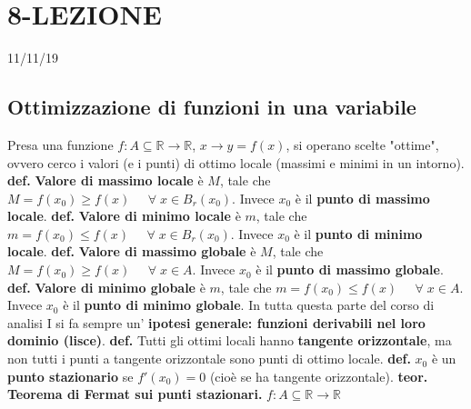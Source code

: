 \section*{8-LEZIONE}
11/11/19
\subsection*{Ottimizzazione di funzioni in una variabile}
Presa una funzione $f: A \subseteq \mathbb{R} \rightarrow  \mathbb{R}$, $x \rightarrow  y = f(x)$, si operano scelte "ottime", ovvero cerco i valori (e i punti) di ottimo locale (massimi e minimi in un intorno). \newline
\newline
\textbf{def.} \textbf{Valore di massimo locale} è $M$, tale che $M = f(x_0) \geq f(x) \;\;\;\;\;\forall\; x \in B_r(x_0)$. Invece $x_0$ è il \textbf{punto di massimo locale}.\newline
\newline
\textbf{def.}  \textbf{Valore di minimo locale} è $m$, tale che $m = f(x_0) \leq f(x) \;\;\;\;\;\forall\; x \in B_r(x_0)$. Invece $x_0$ è il \textbf{punto di minimo locale}.\newline
\newline
\textbf{def.} \textbf{Valore di massimo globale} è $M$, tale che $M = f(x_0) \geq f(x) \;\;\;\;\;\forall\; x \in A$. Invece $x_0$ è il \textbf{punto di massimo globale}.\newline
\newline
\textbf{def.}  \textbf{Valore di minimo globale} è $m$, tale che $m = f(x_0) \leq f(x) \;\;\;\;\;\forall\; x \in A$. Invece $x_0$ è il \textbf{punto di minimo globale}.\newline
\newline
In tutta questa parte del corso di analisi I si fa sempre un' \textbf{ipotesi generale: funzioni derivabili nel loro dominio (lisce)}.\newline
\newline
\textbf{def.} Tutti gli ottimi locali hanno \textbf{tangente orizzontale}, ma non tutti i punti a tangente orizzontale sono punti di ottimo locale.\newline
\newline
\textbf{def.} $x_0$ è un \textbf{punto stazionario} se $f'(x_0) = 0$ (cioè se ha tangente orizzontale).\newline
\newline
\textbf{teor. Teorema di Fermat sui punti stazionari.}\newline
$f: A \subseteq \mathbb{R} \rightarrow  \mathbb{R}$\newline
